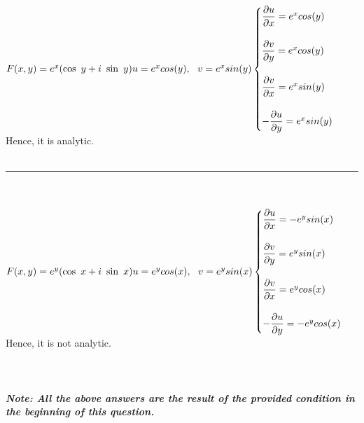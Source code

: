 \documentclass[fleqn]{article}
\begin{document}
\begin{enumerate}
{      $
        F(x,y)=e^x(\cos y+i \sin y) \\
        \\
        u=e^x cos(y), ~~ v=e^x sin(y) \\
        \\
        \begin{cases}
          \dfrac{\partial u}{\partial x}=e^x cos(y) \\
          \\
          \dfrac{\partial v}{\partial y}=e^x cos(y) \\
          \\
          \dfrac{\partial v}{\partial x}=e^x sin(y) \\
          \\
          -\dfrac{\partial u}{\partial y}=e^x sin(y)
        \end{cases}
      $
      Hence, it is analytic.
      \\
      \\
      \rule{15cm}{1pt}
      \\
      \\
      $
        F(x,y)=e^y(\cos x+i \sin x) \\
        \\
        u=e^y cos(x), ~~ v=e^y sin(x) \\
        \\
        \begin{cases}
          \dfrac{\partial u}{\partial x}=-e^y sin(x) \\
          \\
          \dfrac{\partial v}{\partial y}=e^y sin(x) \\
          \\
          \dfrac{\partial v}{\partial x}=e^y cos(x) \\
          \\
          -\dfrac{\partial u}{\partial y}=-e^y cos(x)
        \end{cases}
      $
      Hence, it is not analytic. \\
      \\
      \\
      \\
      \emph{\textbf{Note: All the above answers are the result of the provided condition in the beginning of this question.}}
    }
    
  \end{enumerate}
\end{document}
